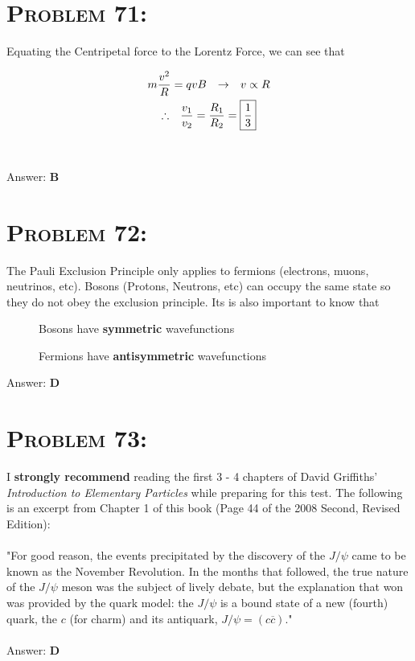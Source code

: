 \documentclass{article}
\begin{document}
\section{\textsc{Problem 71:}} Equating the Centripetal force to the Lorentz Force, we can see that

\begin{gather}
m \frac{v^{2}}{R} = qvB \hspace{.1in} \rightarrow \hspace{.1in} v \propto R\\
\therefore \hspace{.1in} \frac{v_{1}}{v_{2}} = \frac{R_{1}}{R_{2}} = \boxed{\frac{1}{3}}\nonumber
\end{gather}
\\\\
Answer: \textbf{\textcolor{ProcessBlue}B}\\


\section{\textsc{Problem 72:}} The Pauli Exclusion Principle only applies to fermions (electrons, muons, neutrinos, etc). Bosons (Protons, Neutrons, etc) can occupy the same state so they do not obey the exclusion principle. Its is also important to know that

\begin{description}
\item[] Bosons have \textbf{symmetric} wavefunctions

\item[] Fermions have \textbf{antisymmetric} wavefunctions
\end{description}

Answer: \textbf{\textcolor{ProcessBlue}D}\\


\section{\textsc{Problem 73:}} I \textbf{strongly recommend} reading the first 3 - 4 chapters of David Griffiths' \textit{Introduction to Elementary Particles} while preparing for this test. The following is an excerpt from Chapter 1 of this book (Page 44 of the 2008 Second, Revised Edition):\\\\
"For good reason, the events precipitated by the discovery of the $J / \psi$ came to be known as the November Revolution. In the months that followed, the true nature of the $J / \psi$ meson was the subject of lively debate, but the explanation that won was provided by the quark model: the $J / \psi$ is a bound state of a new (fourth) quark, the $c$ (for charm) and its antiquark, $J / \psi = (c \overline{c})$."
\\\\
Answer: \textbf{\textcolor{ProcessBlue}D}\\
\end{document}
